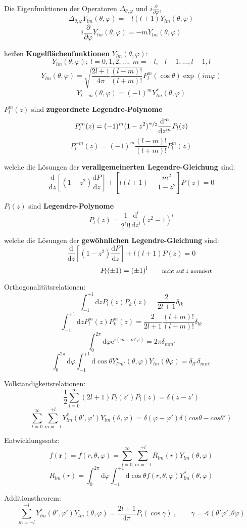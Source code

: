 \documentclass[titlepage,11pt,a4paper,ngerman]{report}
\newcommand{\vphi}{\varphi}
\newcommand{\dd}{\mathrm{d}}
\renewcommand{\vec}[1]{\boldsymbol{#1}}
\begin{document}
Die Eigenfunktionen der Operatoren $\Delta_{\theta,\varphi}$ und $i\frac{\partial}{\partial\varphi}$,
\[\Delta_{\theta,\vphi}Y_{lm}(\theta,\vphi)=-l(l+1)Y_{lm}(\theta,\vphi)\]
\[i\frac{\partial}{\partial\vphi}Y_{lm}(\theta,\vphi)=-mY_{lm}(\theta,\vphi)\]

heißen \textbf{Kugelflächenfunktionen} $Y_{lm}(\theta,\vphi)$:
\[Y_{lm}(\theta,\vphi);\ l=0,1,2,\ldots,\ m=-l,-l+1,\ldots,l-1,l\]
\[Y_{lm}(\theta,\vphi)=\sqrt{\frac{2l+1}{4\pi}\frac{(l-m)!}{(l+m)!}}P_l^m(\cos\theta)\exp(im\vphi)\]
\[Y_{l-m}(\theta,\vphi)=(-1)^mY_{lm}^*(\theta,\vphi)\]

\noindent
$P_l^m(z)$ sind \textbf{zugeordnete Legendre-Polynome}
\[P_l^m(z)=(-1)^m(1-z^2)^{\nicefrac{m}{2}}\frac{\mathrm{d}^m}{\mathrm{d}z^m}P_l(z)\]
\[P_l^{-m}(z)=(-1)^m\frac{(l-m)!}{(l+m)!}P_l^m(z)\]

welche die Lösungen der  \textbf{verallgemeinerten Legendre-Gleichung} sind:
\[\frac{\dd}{\dd z}\left[(1-z^2)\frac{\dd P}{\dd z}\right]+\left[l(l+1)-\frac{m^2}{1-z^2}\right]P(z)=0\]

\noindent
$P_l(z)$ sind \textbf{Legendre-Polynome}
\[P_l(z)=\frac{1}{2^ll!}\frac{\dd^l}{\dd z^l}(z^2-1)^l\]

welche die Lösungen der  \textbf{gewöhnlichen Legendre-Gleichung} sind:
\[\frac{\dd}{\dd z}\left[(1-z^2)\frac{\dd P}{\dd z}\right]+l(l+1)P(z)=0\]
\[P_l(\pm1)=(\pm1)^l\qquad\rlap{\scriptsize{nicht auf 1 normiert}}\]

\noindent
Orthogonalitätsrelationen:
\[\int_{-1}^{+1}\dd zP_l(z)P_k(z)=\frac{2}{2l+1}\delta_{lk}\]
\[\int_{-1}^{+1}\dd zP_l^m(z)P_k^m(z)=\frac{2}{2l+1}\frac{(l+m)!}{(l-m)!}\delta_{lk}\]
\[\int_0^{2\pi}\dd\vphi \mathrm{e}^{i(m-m'\vphi)}=2\pi\delta_{mm'}\]
\[\int_0^{2\pi}\dd\varphi\int_{-1}^{+1}\dd\cos\theta Y_{l'm'}^\star(\theta,\vphi)Y_{lm}(\theta\vphi)=\delta_{ll'}\delta_{mm'}\]

\noindent
Vollständigkeitsrelationen:
\[\frac{1}{2}\sum_{l=0}^\infty(2l+1)P_l(z')P_l(z)=\delta(z-z')\]
\[\sum_{l=0}^{\infty}\sum_{m=-l}^{+l}Y_{lm}^*(\theta',\varphi')Y_{lm}(\theta,\varphi)=\delta(\varphi-\varphi')\delta(cos\theta-cos\theta')\]

\noindent
Entwicklungssatz:
\[f(\vec{r})=f(r,\theta,\varphi)=\sum_{l=0}^{\infty}\sum_{m=-l}^{+l}R_{lm}(r)Y_{lm}(\theta,\varphi)\]
\[R_{lm}(r)=\int_0^{2\pi}\dd\varphi\int_{-1}^{+1}\dd \cos\theta f(r,\theta,\varphi)Y_{lm}^*(\theta,\varphi)\]

\noindent
Additionstheorem:
\[\sum_{m=-l}^{+l}Y_{lm}^*(\theta',\varphi')Y_{lm}(\theta,\varphi)=\frac{2l+1}{4\pi}P_l(\cos\gamma)\ ,\qquad\gamma=\sphericalangle(\theta'\varphi',\theta\varphi)\]
\end{document}
